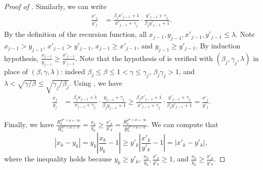 \documentclass[11pt]{amsart}
\newcommand{\abs}[1]{\ensuremath{\left\vert#1\right\vert}}
\theoremstyle{definition}
\theoremstyle{remark}
\begin{document}
\begin{proof}[Proof of ]
Similarly, we can write
\begin{align*}
    \frac{x'_j}{y'_j} &= \frac{\beta_j x'_{j-1} + 1}{x'_{j-1} + \gamma_j} \cdot \frac{y'_{j-1} + \gamma_j}{\beta_j y'_{j-1} + 1}.
\end{align*}
By the definition of the recursion function, all $x_{j-1},y_{j-1},x'_{j-1},y'_{j-1}\leq \lambda$.
Note $x_{j-1} > y_{j-1}$, $x'_{j-1} > y'_{j-1}$, $x_{j-1} \geq x'_{j-1}$, and $y_{j-1} \geq y'_{j-1}$. By induction hypothesis, $\frac{x_{j-1}}{y_{j-1}} \geq \frac{x'_{j-1}}{y'_{j-1}}$.
Note that the hypothesis of  is verified
with $(\beta_j,\gamma_j,\lambda)$ in place of $(\beta,\gamma,\lambda)$:
indeed $\beta_j\leq\beta\leq 1<\gamma\leq\gamma_j$, $\beta_j\gamma_j>1$, and
$\lambda<\sqrt{\gamma/\beta}\leq\sqrt{\gamma_j/\beta_j}$.
Using ,
we have
\begin{align*}
\frac{x_j}{y_j} &= \frac{\beta_j x_{j-1} + 1}{x_{j-1} + \gamma_j} \cdot \frac{y_{j-1} + \gamma_j}{\beta_j y_{j-1} + 1}\geq \frac{\beta_j x'_{j-1} + 1}{x'_{j-1} + \gamma_j} \cdot \frac{y'_{j-1} + \gamma_j}{\beta_j y'_{j-1} + 1} = \frac{x'_j}{y'_j}.
\end{align*}

Finally, we have $\frac{R_v^{\sigma^w \land w \gets \infty}}{R_v^{\sigma^w \land w \gets 0}} = \frac{x_k}{y_k} \geq \frac{x'_k}{y'_k} = \frac{R_v^{\rho^w \land w \gets \infty}}{R_v^{\rho^w \land w \gets 0}}$. 
We can compute that $$|x_k-y_k|=y_k\left | \frac{x_k}{y_k}-1 \right |\geq y'_k\left | \frac{x'_k}{y'_k}-1 \right |=|x'_k-y'_k|,$$
where the inequality holds because $y_k \geq y'_k$, $\frac{x_k}{y_k},\frac{x'_k}{y'_k} \geq 1$, and $\frac{x_k}{y_k} \geq \frac{x'_k}{y'_k}$.


\end{proof}
\end{document}
